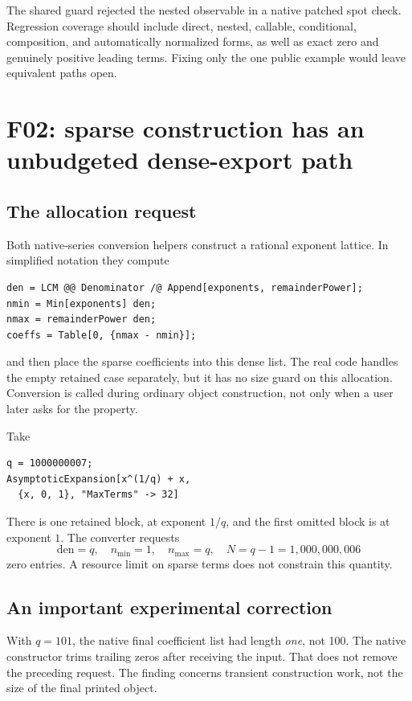 \documentclass[11pt,a4paper]{article}
\newcommand{\code}[1]{\texttt{\detokenize{#1}}}
\begin{document}
The shared guard rejected the nested observable in a native patched spot check. Regression coverage should include direct, nested, callable, conditional, composition, and automatically normalized forms, as well as exact zero and genuinely positive leading terms. Fixing only the one public example would leave equivalent paths open.

\section{F02: sparse construction has an unbudgeted dense-export path}

\subsection{The allocation request}
Both native-series conversion helpers construct a rational exponent lattice. In simplified notation they compute
\begin{lstlisting}
den = LCM @@ Denominator /@ Append[exponents, remainderPower];
nmin = Min[exponents] den;
nmax = remainderPower den;
coeffs = Table[0, {nmax - nmin}];
\end{lstlisting}
and then place the sparse coefficients into this dense list. The real code handles the empty retained case separately, but it has no size guard on this allocation. Conversion is called during ordinary object construction, not only when a user later asks for the \code{"SeriesData"} property.\cite{main}

Take
\begin{lstlisting}
q = 1000000007;
AsymptoticExpansion[x^(1/q) + x,
  {x, 0, 1}, "MaxTerms" -> 32]
\end{lstlisting}
There is one retained block, at exponent $1/q$, and the first omitted block is at exponent $1$. The converter requests
\[
 \mathrm{den}=q,\quad n_{\min}=1,\quad n_{\max}=q,
 \quad N=q-1=1{,}000{,}000{,}006
\]
zero entries. A resource limit on sparse terms does not constrain this quantity.

\subsection{An important experimental correction}
With $q=101$, the native final \code{SeriesData} coefficient list had length \emph{one}, not 100. The native constructor trims trailing zeros after receiving the input. That does not remove the preceding \code{Table} request. The finding concerns transient construction work, not the size of the final printed object.
\end{document}
